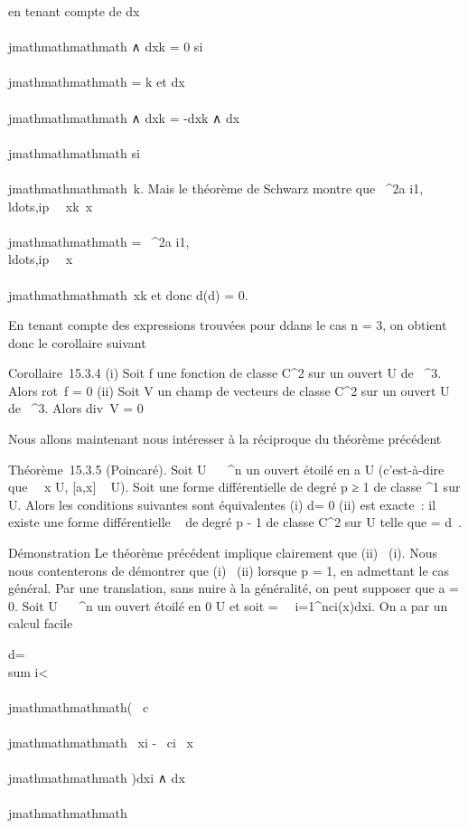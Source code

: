 en tenant compte de dx\\\\jmathmathmathmath ∧ dxk = 0 si \\\\jmathmathmathmath = k et
dx\\\\jmathmathmathmath ∧ dxk = -dxk ∧ dx\\\\jmathmathmathmath si
\\\\jmathmathmathmath\neq~k. Mais le théorème de Schwarz montre que
 \partial~^2a
i1,\\ldots,ip~
\over \partial~xk\partial~x\\\\jmathmathmathmath =
\partial~^2a
i1,\\ldots,ip~
\over \partial~x\\\\jmathmathmathmath\partial~xk et donc d(d\omega) = 0.

En tenant compte des expressions trouvées pour d\omega dans le cas n = 3, on
obtient donc le corollaire suivant

Corollaire~15.3.4 (i) Soit f une fonction de classe C^2 sur
un ouvert U de ~^3. Alors
rot\grad~f = 0 (ii)
Soit V un champ de vecteurs de classe C^2 sur un ouvert U de
~^3. Alors
div\rot~V = 0

Nous allons maintenant nous intéresser à la réciproque du théorème
précédent

Théorème~15.3.5 (Poincaré). Soit U \subset~ ~^n un ouvert étoilé en
a \in U (c'est-à-dire que \forall~~x \in U, {[}a,x{]} \subset~
U). Soit \omega une forme différentielle de degré p ≥ 1 de classe
^1 sur U. Alors les conditions suivantes sont équivalentes
(i) d\omega = 0 (ii) \omega est exacte~: il existe une forme différentielle \alpha~ de
degré p - 1 de classe C^2 sur U telle que \omega = d\alpha~.

Démonstration Le théorème précédent implique clairement que (ii) \rigtharrow~(i).
Nous nous contenterons de démontrer que (i) \rigtharrow~(ii) lorsque p = 1, en
admettant le cas général. Par une translation, sans nuire à la
généralité, on peut supposer que a = 0. Soit U \subset~ ~^n un
ouvert étoilé en 0 \in U et soit \omega =\
\sum ~
i=1^nci(x)dxi. On a par un calcul
facile

d\omega = \\sum
i\textless{}\\\\jmathmathmathmath\left ( \partial~c\\\\jmathmathmathmath
\over \partial~xi - \partial~ci
\over \partial~x\\\\jmathmathmathmath \right
)dxi ∧ dx\\\\jmathmathmathmath

